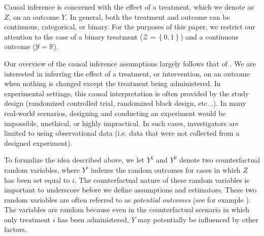 \documentclass[11pt,  dvipsnames, table, x11name]{article}
\newcommand{\R}{\mathbb{R}}
\begin{document}
	Causal inference is concerned with the effect of a treatment, which we denote as $Z$, on an 
	outcome $Y$. In general, both the treatment and outcome can be continuous, categorical, or binary. 
	For the purposes of this paper, we restrict our attention to the case of a binary treatment 
	($\mathcal{Z} = \left\{0,1\right\}$) and a continuous outcome ($\mathcal{Y} = \R$). 
	
	Our overview of the causal inference assumptions largely follows that of \cite{hernan2020causal}. 
	We are interested in inferring the effect of a treatment, or intervention, on an outcome when 
	nothing is changed except the treatment being administered. In experimental settings, 
	this causal interpretation is often provided by the study design (randomized controlled trial, 
	randomized block design, etc...). In many real-world scenarios, designing and conducting an 
	experiment would be impossible, unethical, or highly impractical. In such cases, investigators 
	are limited to using observational data (i.e. data that were not collected from a designed 
	experiment).
	
	To formalize the idea described above, we let $Y^1$ and $Y^0$ denote two counterfactual random variables, 
	where $Y^i$ indexes the random outcomes for cases in which $Z$ has been set equal to $i$. The counterfactual 
	nature of these random variables is important to underscore before we define assumptions and estimators. 
	These two random variables are often referred to as \textit{potential outcomes} (see for example \cite{hernan2020causal}).
	The variables are random because even in the counterfactual scenario in which only treatment $i$ has 
	been administered, $Y$ may potentially be influenced by other factors.
	
\end{document}
